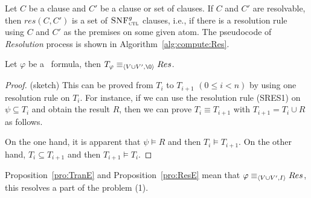 \documentclass{article}
\begin{document}
Let $C$ be a clause and $C'$ be a clause or set of clauses. If $C$ and $C'$ are resolvable, then $res(C,C')$ is a set of ${\textsc{SNF}_{\textsc{ctl}}^g}$ clauses, i.e., if there is a resolution rule using $C$ and $C'$ as the premises on some given atom.
The pseudocode of \emph{Resolution} process is  shown in Algorithm~\ref{alg:compute:Res}.
\begin{proposition}\label{pro:ResE}
 Let $\varphi$ be a \CTL\ formula,
 then $T_{\varphi} \equiv_{\tuple{V \cup V', {\O}}} Res$.
\end{proposition}
\begin{proof}(sketch)
This can be proved from $T_i$ to $T_{i+1}$ $(0\leq i < n)$ by using one resolution rule on $T_i$.
For instance, if we can use the resolution rule (SRES1) on $\psi\subseteq T_i$ and obtain the result $R$, then we can prove $T_i \equiv T_{i+1}$ with $T_{i+1} = T_i \cup R$ as follows.

On the one hand, it is apparent that $\psi \models R$ and then $T_i \models T_{i+1}$. On the other hand, $T_i\subseteq T_{i+1}$ and then $T_{i+1} \models T_i$.




%

%

\end{proof}
Proposition~\ref{pro:TranE} and Proposition~\ref{pro:ResE} mean that $\varphi \equiv_{{\langle{V \cup V', I}\rangle}} Res$, this resolves a part of the problem (1).
\end{document}
